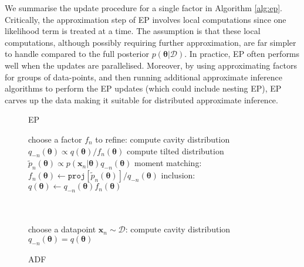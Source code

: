 We summarise the update procedure for a single factor in Algorithm \ref{alg:ep}. Critically, the approximation step of EP involves local computations since one likelihood term is treated at a time. The assumption is that these local computations, although possibly requiring further approximation, are far simpler to handle compared to the full posterior $p(\bm{\theta}| \mathcal{D})$. In practice, EP often performs well when the updates are parallelised. Moreover, by using approximating factors for groups of data-points, and then running additional approximate inference algorithms to perform the EP updates (which could include nesting EP), EP carves up the data making it suitable for distributed approximate inference.

\begin{figure}[!t]
\begin{minipage}[t]{0.33\linewidth}
\centering
\begin{algorithm}[H] 
\caption{EP} \small
\label{alg:ep} 
\begin{algorithmic}[1] 
	\STATE choose a factor $f_n$ to refine:
	\STATE compute cavity distribution \\$q_{-n}(\bm{\theta}) \propto q(\bm{\theta}) / f_n(\bm{\theta})$ 
	\STATE compute tilted distribution \\$\tilde{p}_n(\bm{\theta}) \propto p(\bm{x}_n|\bm{\theta}) q_{-n}(\bm{\theta})$
	\STATE moment matching: \\ \hspace{-1mm}$f_n(\bm{\theta}) \leftarrow \mathtt{proj}[\tilde{p}_n(\bm{\theta})] / q_{-n}(\bm{\theta}) $
	\STATE inclusion:\\ $q(\bm{\theta}) \leftarrow q_{-n}(\bm{\theta}) f_n(\bm{\theta})$\\\hspace{1mm}\\ \vspace{1.5mm} \hspace{1mm}\\
\end{algorithmic}
\end{algorithm}
\end{minipage}
%
\begin{minipage}[t]{0.33\linewidth}
\centering
\begin{algorithm}[H] 
\caption{ADF} \small
\label{alg:adf} 
\begin{algorithmic}[1] 
	\STATE choose a datapoint $\bm{x}_n\sim \mathcal{D}$:
	\STATE compute cavity distribution \\$q_{-n}(\bm{\theta}) = q(\bm{\theta})$

\end{algorithmic}
\end{algorithm}
\end{minipage}
\end{figure}
